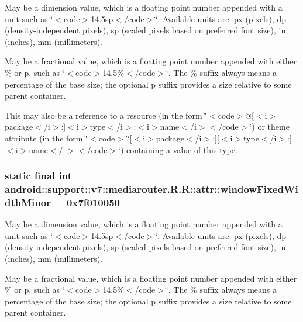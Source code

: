 May be a dimension value, which is a floating point number appended with a unit such as \char`\"{}$<$code$>$14.5sp$<$/code$>$\char`\"{}. Available units are: px (pixels), dp (density-independent pixels), sp (scaled pixels based on preferred font size), in (inches), mm (millimeters). 

May be a fractional value, which is a floating point number appended with either \% or p, such as \char`\"{}$<$code$>$14.5\%$<$/code$>$\char`\"{}. The \% suffix always means a percentage of the base size; the optional p suffix provides a size relative to some parent container. 

This may also be a reference to a resource (in the form \char`\"{}$<$code$>$@\mbox{[}$<$i$>$package$<$/i$>$:\mbox{]}$<$i$>$type$<$/i$>$:$<$i$>$name$<$/i$>$$<$/code$>$\char`\"{}) or theme attribute (in the form \char`\"{}$<$code$>$?\mbox{[}$<$i$>$package$<$/i$>$:\mbox{]}\mbox{[}$<$i$>$type$<$/i$>$:\mbox{]}$<$i$>$name$<$/i$>$$<$/code$>$\char`\"{}) containing a value of this type. \hypertarget{classandroid_1_1support_1_1v7_1_1mediarouter_1_1_r_1_1attr_7a6f76fe9c0c2f95fb20eadd82ded933}{
\subsubsection[{windowFixedWidthMinor}]{\setlength{\rightskip}{0pt plus 5cm}static final int android::support::v7::mediarouter.R.R::attr::windowFixedWidthMinor = 0x7f010050}}
\label{classandroid_1_1support_1_1v7_1_1mediarouter_1_1_r_1_1attr_7a6f76fe9c0c2f95fb20eadd82ded933}


May be a dimension value, which is a floating point number appended with a unit such as \char`\"{}$<$code$>$14.5sp$<$/code$>$\char`\"{}. Available units are: px (pixels), dp (density-independent pixels), sp (scaled pixels based on preferred font size), in (inches), mm (millimeters). 

May be a fractional value, which is a floating point number appended with either \% or p, such as \char`\"{}$<$code$>$14.5\%$<$/code$>$\char`\"{}. The \% suffix always means a percentage of the base size; the optional p suffix provides a size relative to some parent container. 

